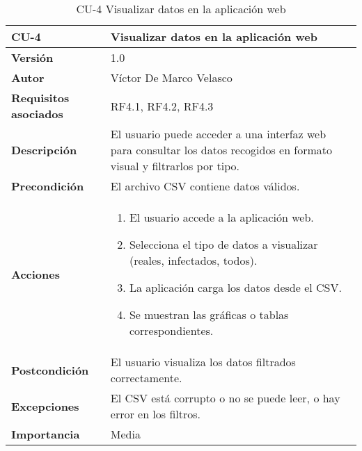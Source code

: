 \begin{table}[p]
	\centering
	\begin{tabularx}{\linewidth}{ p{} p{} }
		\toprule
		\textbf{CU-4}    & Visualizar datos en la aplicación web \\
		\toprule
		\textbf{Versión}              & 1.0 \\
		\textbf{Autor}                & Víctor De Marco Velasco \\
		\textbf{Requisitos asociados} & RF4.1, RF4.2, RF4.3 \\
		\textbf{Descripción}          & El usuario puede acceder a una interfaz web para consultar los datos recogidos en formato visual y filtrarlos por tipo. \\
		\textbf{Precondición}         & El archivo CSV contiene datos válidos. \\
		\textbf{Acciones}             &
		\begin{enumerate}
			\item El usuario accede a la aplicación web.
			\item Selecciona el tipo de datos a visualizar (reales, infectados, todos).
			\item La aplicación carga los datos desde el CSV.
			\item Se muestran las gráficas o tablas correspondientes.
		\end{enumerate}\\
		\textbf{Postcondición}        & El usuario visualiza los datos filtrados correctamente. \\
		\textbf{Excepciones}          & El CSV está corrupto o no se puede leer, o hay error en los filtros. \\
		\textbf{Importancia}          & Media \\
		\bottomrule
	\end{tabularx}
	\caption{CU-4 Visualizar datos en la aplicación web}
\end{table}

